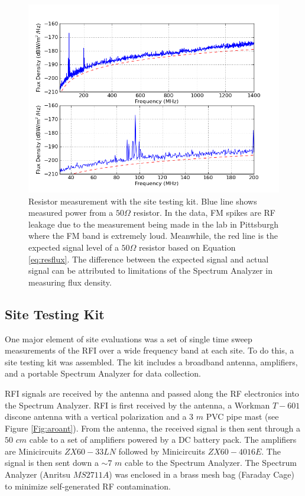 \begin{figure}[htb]
\begin{center}
\includegraphics[width=0.9\linewidth]{RFI_testing/figures/50Ohm_cal.png}
\caption{Resistor measurement with the site testing kit. Blue line shows measured power from a $50 \Omega$ resistor. In the data, FM spikes are RF leakage due to the measurement being made in the lab in Pittsburgh where the FM band is extremely loud. Meanwhile, the red line is the expected signal level of a $50 \Omega$ resistor based on Equation \ref{eq:resflux}. The difference between the expected signal and actual signal can be attributed to limitations of the Spectrum Analyzer in measuring flux density.}
\label{Fig:resflux}
\end{center}
\end{figure}

\subsection{Site Testing Kit} \label{Sec:site_kit}

One major element of site evaluations was a set of single time sweep measurements of the RFI over a wide frequency band at each site. To do this, a site testing kit was assembled. The kit includes a broadband antenna, amplifiers, and a portable Spectrum Analyzer for data collection. 

RFI signals are received by the antenna and passed along the RF electronics into the Spectrum Analyzer. RFI is first received by the antenna, a Workman $T-601$ discone antenna with a vertical polarization and a 3 $m$ PVC pipe mast (see Figure \ref{Fig:aroant}). From the antenna, the received signal is then sent through a $50$ $cm$ cable to a set of amplifiers powered by a DC battery pack. The amplifiers are Minicircuits $ZX60-33LN$ followed by Minicircuits $ZX60-4016E$. The signal is then sent down a $\sim 7$ $m$ cable to the Spectrum Analyzer. The Spectrum Analyzer (Anritsu $MS2711A$) was enclosed in a brass mesh bag (Faraday Cage) to minimize self-generated RF contamination. 

